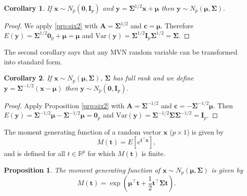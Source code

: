\documentclass[]{book}
\newtheorem{corollary}{Corollary}[chapter]
\newtheorem{proposition}{Proposition}[chapter]
\theoremstyle{definition}
\theoremstyle{definition}
\theoremstyle{definition}
\theoremstyle{remark}
\begin{document}
\begin{corollary}
\protect\hypertarget{cor:csix2}{}{\label{cor:csix2} } If \(\boldsymbol x\sim N_p(\boldsymbol 0,\boldsymbol I_p)\) and \(\boldsymbol y= \boldsymbol \Sigma^{1/2} \boldsymbol x+ \boldsymbol \mu\) then \(\boldsymbol y\sim N_p(\boldsymbol \mu,\boldsymbol \Sigma)\).
\end{corollary}

\begin{proof}
{}We apply \ref{prp:six2} with \(\boldsymbol A= \boldsymbol \Sigma^{1/2}\) and \(\boldsymbol c= \boldsymbol \mu\). Therefore \(E(\boldsymbol y) = \boldsymbol \Sigma^{1/2} \boldsymbol 0_p + \boldsymbol \mu= \boldsymbol \mu\) and \(\text{Var}(\boldsymbol y) = \boldsymbol \Sigma^{1/2} \boldsymbol I_p \boldsymbol \Sigma^{1/2} = \boldsymbol \Sigma\).
\end{proof}

The second corollary says that any MVN random variable can be transformed into standard form.

\begin{corollary}
\protect\hypertarget{cor:csix3}{}{\label{cor:csix3} }If \(\boldsymbol x\sim N_p(\boldsymbol \mu,\boldsymbol \Sigma)\), \(\boldsymbol \Sigma\) has full rank and we define \(\boldsymbol y= \boldsymbol \Sigma^{-1/2}(\boldsymbol x- \boldsymbol \mu)\) then \(\boldsymbol y\sim N_p(\boldsymbol 0,\boldsymbol I_p)\).
\end{corollary}

\begin{proof}
{}Apply Proposition \ref{prp:six2} with \(\boldsymbol A= \boldsymbol \Sigma^{-1/2}\) and \(\boldsymbol c= - \boldsymbol \Sigma^{-1/2} \boldsymbol \mu\). Then \(E(\boldsymbol y) = \boldsymbol \Sigma^{-1/2} \boldsymbol \mu- \boldsymbol \Sigma^{-1/2} \boldsymbol \mu= \boldsymbol 0_p\) and \(\text{Var}(\boldsymbol y) = \boldsymbol \Sigma^{-1/2} \boldsymbol \Sigma\boldsymbol \Sigma^{-1/2} = \boldsymbol I_p\).
\end{proof}

The moment generating function of a random vector \(\boldsymbol x\) (\(p \times 1\)) is given by
\[
M({\boldsymbol t})=E[e^{{\boldsymbol t}^\top \boldsymbol x}],
\]
and is defined for all \(t \in \mathbb{R}^p\) for which \(M({\boldsymbol t})\) is finite.

\begin{proposition}
\protect\hypertarget{prp:six3}{}{\label{prp:six3} } The moment generating function of \(\boldsymbol x\sim N_p(\boldsymbol \mu, \boldsymbol \Sigma)\) is given by
\begin{equation}
M({\boldsymbol t})=\exp \left (\boldsymbol \mu^\top  {\boldsymbol t}+ \frac{1}{2} {\boldsymbol t}^\top \boldsymbol \Sigma{\boldsymbol t}\right).
\label{eq:Mt}
\end{equation}
\end{proposition}
\end{document}
